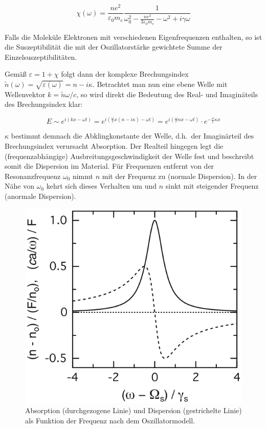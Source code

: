 \begin{equation}
    \chi(\omega) = \frac{n e^{2}}{\varepsilon_{0} m_{e}} \frac{1}{\omega_{0}^{2} - \frac{n e^{2}}{3 \varepsilon_{0} m_{e}} - \omega^{2} + i \gamma \omega}
\end{equation}

Falls die Moleküle Elektronen mit verschiedenen Eigenfrequenzen enthalten, so ist die Suszeptibilität die mit der Oszillatorstärke gewichtete Summe der Einzelsuszeptibilitäten.

Gemäß $\varepsilon = 1 + \chi$ folgt dann der komplexe Brechungsindex $\tilde{n}(\omega) = \sqrt{\varepsilon(\omega)} = n - i \kappa$. Betrachtet man nun eine ebene Welle mit Wellenvektor $k = \tilde{n}\omega/c$, so wird direkt die Bedeutung des Real- und Imaginäteils des Brechungsindex klar:

\begin{equation}
    E \sim e^{i(kx - \omega t)} = e^{i(\frac{\omega}{c}x (n-i\kappa) - \omega t)} = e^{i(\frac{\omega}{c}n x - \omega t)} \cdot e^{- \frac{\omega}{c} \kappa x}
\end{equation}

$\kappa$ bestimmt demnach die Abklingkonstante der Welle, d.h.\ der Imaginärteil des Brechungsindex verursacht Absorption. Der Realteil hingegen legt die (frequenzabhängige) Ausbreitungsgeschwindigkeit der Welle fest und beschreibt somit die Dispersion im Material. Für Frequenzen entfernt von der Resonanzfrequenz $\omega_{0}$ nimmt $n$ mit der Frequenz zu (normale Dispersion). In der Nähe von $\omega_{0}$ kehrt sich dieses Verhalten um und $n$ sinkt mit steigender Frequenz (anormale Dispersion).

\begin{figure}[htb]
    \centering
    \includegraphics[width = 0.5 \textwidth]{Dispersion_Absorption.png}
    \caption{Absorption (durchgezogene Linie) und Dispersion (gestrichelte Linie) als Funktion der Frequenz nach dem Oszillatormodell.}
\end{figure}

